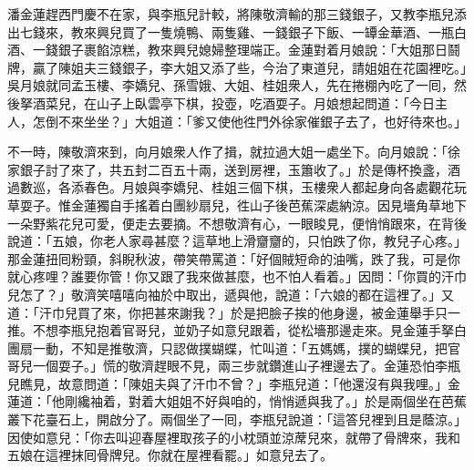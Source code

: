 潘金蓮趕西門慶不在家，與李瓶兒計較，將陳敬濟輸的那三錢銀子，又教李瓶兒添出七錢來，教來興兒買了一隻燒鴨、兩隻雞、一錢銀子下飯、一罈金華酒、一瓶白酒、一錢銀子裹餡涼糕，教來興兒媳婦整理端正。金蓮對着月娘說：「大姐那日鬪牌，贏了陳姐夫三錢銀子，李大姐又添了些，今治了東道兒，請姐姐在花園裡吃。」吳月娘就同孟玉樓、李嬌兒、孫雪娥、大姐、桂姐衆人，先在捲棚內吃了一囘，然後拏酒菜兒，在山子上臥雲亭下棋，投壺，吃酒耍子。月娘想起問道：「今日主人，怎倒不來坐坐？」大姐道：「爹又使他徃門外徐家催銀子去了，也好待來也。」

不一時，陳敬濟來到，向月娘衆人作了揖，就拉過大姐一處坐下。向月娘說：「徐家銀子討了來了，共五封二百五十兩，送到房裡，玉簫收了。」於是傳杯換盞，酒過數巡，各添春色。月娘與李嬌兒、桂姐三個下棋，玉樓衆人都起身向各處觀花玩草耍子。惟金蓮獨自手搖着白團紗扇兒，徃山子後芭蕉深處納涼。{}因見墻角草地下一朵野紫花兒可愛，便走去要摘。不想敬濟有心，一眼睃見，便悄悄跟來，{}在背後說道：「五娘，你老人家尋甚麼？這草地上滑齏齏的，只怕跌了你，教兒子心疼。」{}那金蓮扭囘粉頸，斜睨秋波，帶笑帶罵道：「好個賊短命的油嘴，跌了我，可是你就心疼哩？誰要你管！你又跟了我來做甚麼，也不怕人看着。」因問：「你買的汗巾兒怎了？」敬濟笑嘻嘻向袖於中取出，遞與他，說道：「六娘的都在這裡了。」又道：「汗巾兒買了來，你把甚來謝我？」於是把臉子挨的他身邊，被金蓮舉手只一推。不想李瓶兒抱着官哥兒，並奶子如意兒跟着，從松墻那邊走來。見金蓮手拏白團扇一動，不知是推敬濟，只認做撲蝴蝶，忙叫道：「五媽媽，撲的蝴蝶兒，把官哥兒一個耍子。」慌的敬濟趕眼不見，兩三步就鑽進山子裡邊去了。金蓮恐怕李瓶兒瞧見，故意問道：「陳姐夫與了汗巾不曾？」{}李瓶兒道：「他還沒有與我哩。」金蓮道：「他剛纔袖着，對着大姐姐不好與咱的，悄悄遞與我了。」於是兩個坐在芭蕉叢下花臺石上，開啟分了。兩個坐了一囘，李瓶兒說道：「這答兒裡到且是蔭涼。」因使如意兒：「你去叫迎春屋裡取孩子的小枕頭並涼蓆兒來，就帶了骨牌來，我和五娘在這裡抹囘骨牌兒。你就在屋裡看罷。」如意兒去了。

